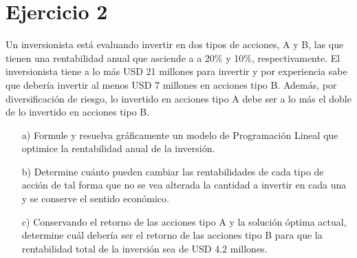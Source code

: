 \documentclass[letterpaper,11pt,oneside]{article}
\begin{document}
\section*{Ejercicio 2}

Un inversionista está evaluando invertir en dos tipos de acciones, A y B, las que tienen una rentabilidad anual que asciende a a 20\% y 10\%, respectivamente. El inversionista tiene a lo más USD 21 millones para invertir y por experiencia sabe que debería invertir al menos USD 7 millones en acciones tipo B. Además, por diversificación de riesgo, lo invertido en acciones tipo A debe ser a lo más el doble de lo invertido en acciones tipo B.

\begin{itemize}
	\item[a)] Formule y resuelva gráficamente un modelo de Programación Lineal que optimice la rentabilidad anual de la inversión.
	\item[b)] Determine cuánto pueden cambiar las rentabilidades de cada tipo de acción de tal forma que no se vea alterada la cantidad a invertir en cada una y se conserve el sentido económico.
	\item[c)] Conservando el retorno de las acciones tipo A y la solución óptima actual, determine cuál debería ser el retorno de las acciones tipo B para que la rentabilidad total de la inversión sea de USD 4.2 millones.
\end{itemize}
\end{document}
